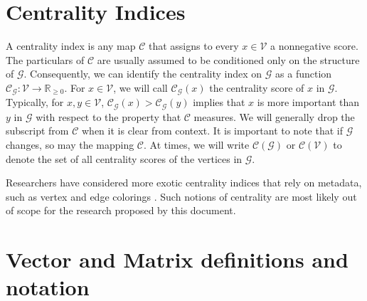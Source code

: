 \documentclass[10]{article}
\begin{document}
\section{Centrality Indices} \label{sec:centrality}

A centrality index is any map $\mathcal{C}$ that assigns to every $x \in \mathcal{V}$ a nonnegative score.
The particulars of $\mathcal{C}$ are usually assumed to be conditioned only on the structure of $\mathcal{G}$.
Consequently, we can identify the centrality index on $\mathcal{G}$ as a function $\mathcal{C}_\mathcal{G} : \mathcal{V} \rightarrow \mathbb{R}_{\geq 0}$.
For $x \in \mathcal{V}$, we will call $\mathcal{C}_\mathcal{G}(x)$ the centrality score of $x$ in $\mathcal{G}$. 
Typically, for $x,y \in \mathcal{V}$, $\mathcal{C}_\mathcal{G}(x) > \mathcal{C}_\mathcal{G}(y)$ implies that $x$ is more important than $y$ in $\mathcal{G}$ with respect to the property that $\mathcal{C}$ measures. 
We will generally drop the subscript from $\mathcal{C}$ when it is clear from context. 
It is important to note that if $\mathcal{G}$ changes, so may the mapping $\mathcal{C}$. 
At times, we will write $\mathcal{C}(\mathcal{G})$ or $\mathcal{C}(\mathcal{V})$ to denote the set of all centrality scores of the vertices in $\mathcal{G}$. 

Researchers have considered more exotic centrality indices that rely on metadata, such as vertex and edge colorings \cite{kang2016diffusion}.
Such notions of centrality are most likely out of scope for the research proposed by this document. 


\section{Vector and Matrix definitions and notation} \label{sec:matdef}
\end{document}
